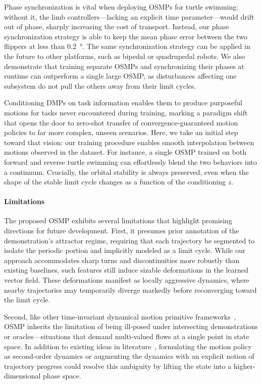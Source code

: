 Phase synchronization is vital when deploying \glspl{OSMP} for turtle swimming: without it, the limb controllers—lacking an explicit time parameter—would drift out of phase, sharply increasing the cost of transport. Instead, our phase synchronization strategy is able to keep the mean phase error between the two flippers at less than \SI{0.2}{\degree}.
The same synchronization strategy can be applied in the future to other platforms, such as bipedal or quadrupedal robots. We also demonstrate that training separate \glspl{OSMP} and synchronizing their phases at runtime can outperform a single large \gls{OSMP}, as disturbances affecting one subsystem do not pull the others away from their limit cycles.

Conditioning \glspl{DMP} on task information enables them to produce purposeful motions for tasks never encountered during training, marking a paradigm shift that opens the door to zero-shot transfer of convergence-guaranteed motion policies to far more complex, unseen scenarios. Here, we take an initial step toward that vision: our training procedure enables smooth interpolation between motions observed in the dataset. For instance, a single \gls{OSMP} trained on both forward and reverse turtle swimming can effortlessly blend the two behaviors into a continuum.
Crucially, the orbital stability is always preserved, even when the shape of the stable limit cycle changes as a function of the conditioning $z$.


\paragraph{Limitations}
The proposed \gls{OSMP} exhibits several limitations that highlight promising directions for future development. First, it presumes prior annotation of the demonstration’s attractor regime, requiring that each trajectory be segmented to isolate the periodic portion and implicitly modeled as a limit cycle. While our approach accommodates sharp turns and discontinuities more robustly than existing baselines, such features still induce sizable deformations in the learned vector field. These deformations manifest as locally aggressive dynamics, where nearby trajectories may temporarily diverge markedly before reconverging toward the limit cycle.

Second, like other time-invariant dynamical motion primitive frameworks~\citep{ijspeert2002learning, ijspeert2013dynamical, rana2020euclideanizing, perez2023stable}, \gls{OSMP} inherits the limitation of being ill-posed under intersecting demonstrations or oracles—situations that demand multi-valued flows at a single point in state space. In addition to existing ideas in literature~\citep{sun2024directionality}, formulating the motion policy as second-order dynamics or augmenting the dynamics with an explicit notion of trajectory progress could resolve this ambiguity by lifting the state into a higher-dimensional phase space.

